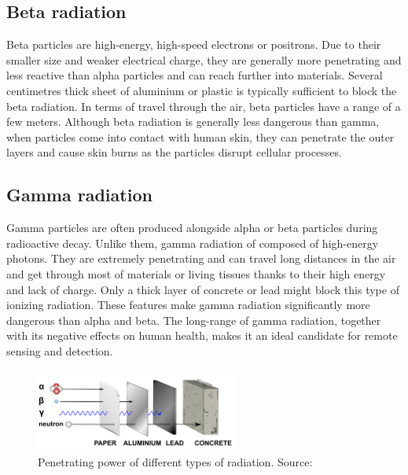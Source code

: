 \subsection{Beta radiation}
Beta particles are high-energy, high-speed electrons or positrons.
Due to their smaller size and weaker electrical charge, they are generally more penetrating and less reactive than alpha particles and can reach further into materials.
Several centimetres thick sheet of aluminium or plastic is typically sufficient to block the beta radiation.
In terms of travel through the air, beta particles have a range of a few meters.
Although beta radiation is generally less dangerous than gamma, when particles come into contact with human skin, they can penetrate the outer layers and cause skin burns as the particles disrupt cellular processes.

\subsection{Gamma radiation}
Gamma particles are often produced alongside alpha or beta particles during radioactive decay. 
Unlike them, gamma radiation of composed of high-energy photons. 
They are extremely penetrating and can travel long distances in the air and get through most of materials or living tissues thanks to their high energy and lack of charge.
Only a thick layer of concrete or lead might block this type of ionizing radiation.
These features make gamma radiation significantly more dangerous than alpha and beta.
The long-range of gamma radiation, together with its negative effects on human health, makes it an ideal candidate for remote sensing and detection.
  \begin{figure}[!h]
    \centering
      \includegraphics[width=0.6\textwidth]{./fig/photos/pene2.png}
    \caption{Penetrating power of different types of radiation. Source: \cite{penetrating_power}}
  \end{figure}

